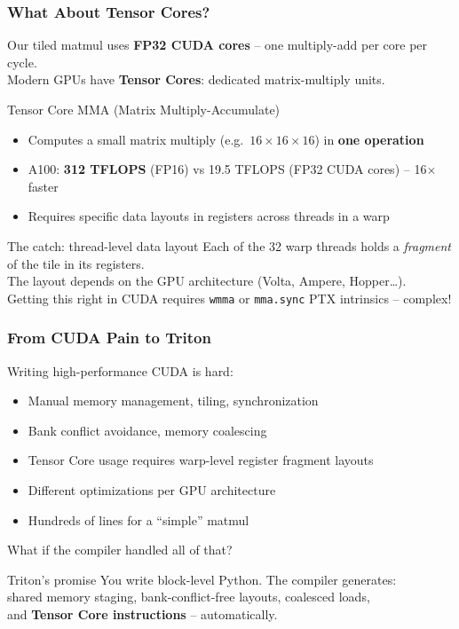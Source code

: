 \documentclass[aspectratio=169]{beamer}
\begin{document}
\begin{frame}
	\frametitle{What About Tensor Cores?}
	Our tiled matmul uses \textbf{FP32 CUDA cores} -- one multiply-add per core per cycle. \\
	Modern GPUs have \textbf{Tensor Cores}: dedicated matrix-multiply units.
	\vspace{0.5em}
	\begin{block}{Tensor Core MMA (Matrix Multiply-Accumulate)}
		\begin{itemize}
			\item Computes a small matrix multiply (e.g.\ $16 \times 16 \times 16$) in \textbf{one operation}
			\item A100: \textbf{312 TFLOPS} (FP16) vs 19.5 TFLOPS (FP32 CUDA cores) -- 16$\times$ faster
			\item Requires specific data layouts in registers across threads in a warp
		\end{itemize}
	\end{block}
	\vspace{0.5em}
	\begin{alertblock}{The catch: thread-level data layout}
		Each of the 32 warp threads holds a \textit{fragment} of the tile in its registers. \\
		The layout depends on the GPU architecture (Volta, Ampere, Hopper\ldots). \\
		Getting this right in CUDA requires \texttt{wmma} or \texttt{mma.sync} PTX intrinsics -- complex!
	\end{alertblock}
\end{frame}

\begin{frame}
	\frametitle{From CUDA Pain to Triton}
	Writing high-performance CUDA is hard:
	\begin{itemize}
		\item Manual memory management, tiling, synchronization
		\item Bank conflict avoidance, memory coalescing
		\item Tensor Core usage requires warp-level register fragment layouts
		\item Different optimizations per GPU architecture
		\item Hundreds of lines for a ``simple'' matmul
	\end{itemize}
	\vspace{0.5em}
	\begin{center}
		\textcolor{codegreen}{\large What if the compiler handled all of that?}
	\end{center}
	\vspace{0.5em}
	\begin{block}{Triton's promise}
		You write block-level Python. The compiler generates: \\
		shared memory staging, bank-conflict-free layouts, coalesced loads, \\
		and \textbf{Tensor Core instructions} -- automatically.
	\end{block}
\end{frame}
\end{document}
